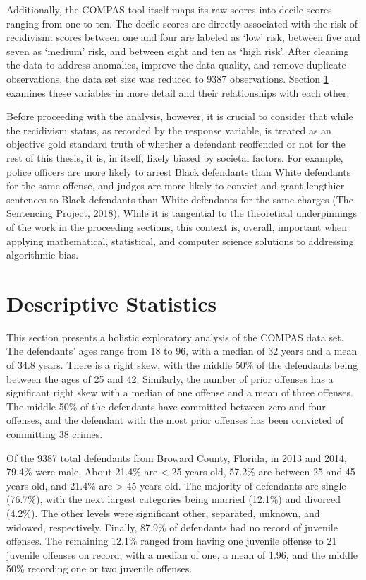 \documentclass[12pt, twoside]{amherstthesis}
\begin{document}
Additionally, the COMPAS tool itself maps its raw scores into decile scores ranging from one to ten. The decile scores are directly associated with the risk of recidivism: scores between one and four are labeled as `low' risk, between five and seven as `medium' risk, and between eight and ten as `high risk'. After cleaning the data to address anomalies, improve the data quality, and remove duplicate observations, the data set size was reduced to 9387 observations. Section \ref{descriptivestats} examines these variables in more detail and their relationships with each other.

Before proceeding with the analysis, however, it is crucial to consider that while the recidivism status, as recorded by the response variable, is treated as an objective gold standard truth of whether a defendant reoffended or not for the rest of this thesis, it is, in itself, likely biased by societal factors. For example, police officers are more likely to arrest Black defendants than White defendants for the same offense, and judges are more likely to convict and grant lengthier sentences to Black defendants than White defendants for the same charges (The Sentencing Project, 2018). While it is tangential to the theoretical underpinnings of the work in the proceeding sections, this context is, overall, important when applying mathematical, statistical, and computer science solutions to addressing algorithmic bias.

\hypertarget{descriptivestats}{%
\section{Descriptive Statistics}\label{descriptivestats}}

This section presents a holistic exploratory analysis of the COMPAS data set. The defendants' ages range from 18 to 96, with a median of 32 years and a mean of 34.8 years. There is a right skew, with the middle 50\% of the defendants being between the ages of 25 and 42. Similarly, the number of prior offenses has a significant right skew with a median of one offense and a mean of three offenses. The middle 50\% of the defendants have committed between zero and four offenses, and the defendant with the most prior offenses has been convicted of committing 38 crimes.

Of the 9387 total defendants from Broward County, Florida, in 2013 and 2014, 79.4\% were male. About 21.4\% are \textless{} 25 years old, 57.2\% are between 25 and 45 years old, and
21.4\% are \textgreater{} 45 years old. The majority of defendants are single (76.7\%), with the next largest categories being married (12.1\%) and divorced (4.2\%). The other levels were significant other, separated, unknown, and widowed, respectively. Finally, 87.9\% of defendants had no record of juvenile offenses. The remaining 12.1\% ranged from having one juvenile offense to 21 juvenile offenses on record, with a median of one, a mean of 1.96, and the middle 50\% recording one or two juvenile offenses.
\end{document}

